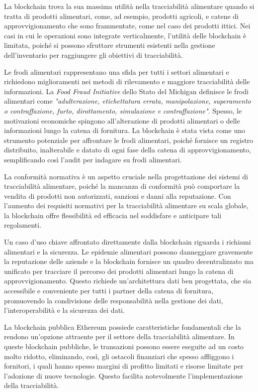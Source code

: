 La blockchain trova la sua massima utilità nella tracciabilità alimentare quando si tratta di prodotti alimentari, come, ad esempio, prodotti agricoli, e catene di approvvigionamento che sono frammentate, come nel caso dei prodotti ittici. Nei casi in cui le operazioni sono integrate verticalmente, l'utilità delle blockchain è limitata, poiché si possono sfruttare strumenti esistenti nella gestione dell'inventario per raggiungere gli obiettivi di tracciabilità.

Le frodi alimentari rappresentano una sfida per tutti i settori alimentari e richiedono miglioramenti nei metodi di rilevamento e maggiore tracciabilità delle informazioni. La \textit{Food Fraud Initiative} dello Stato del Michigan definisce le frodi alimentari come \textit{"adulterazione, etichettatura errata, manipolazione, superamento o contraffazione, furto, dirottamento, simulazione e contraffazione"}. Spesso, le motivazioni economiche spingono all'alterazione di prodotti alimentari o delle informazioni lungo la catena di fornitura. La blockchain è stata vista come uno strumento potenziale per affrontare le frodi alimentari, poiché fornisce un registro distribuito, inalterabile e datato di ogni fase della catena di approvvigionamento, semplificando così l'audit per indagare su frodi alimentari.

La conformità normativa è un aspetto cruciale nella progettazione dei sistemi di tracciabilità alimentare, poiché la mancanza di conformità può comportare la vendita di prodotti non autorizzati, sanzioni e danni alla reputazione. Con l'aumento dei requisiti normativi per la tracciabilità alimentare su scala globale, la blockchain offre flessibilità ed efficacia nel soddisfare e anticipare tali regolamenti.

Un caso d'uso chiave affrontato direttamente dalla blockchain riguarda i richiami alimentari e la sicurezza. Le epidemie alimentari possono danneggiare gravemente la reputazione delle aziende e la blockchain fornisce un quadro decentralizzato ma unificato per tracciare il percorso dei prodotti alimentari lungo la catena di approvvigionamento. Questo richiede un'architettura dati ben progettata, che sia accessibile e conveniente per tutti i partner della catena di fornitura, promuovendo la condivisione delle responsabilità nella gestione dei dati, l'interoperabilità e la sicurezza dei dati.

La blockchain pubblica Ethereum possiede caratteristiche fondamentali che la rendono un'opzione attraente per il settore della tracciabilità alimentare. In queste blockchain pubbliche, le transazioni possono essere eseguite ad un costo molto ridotto, eliminando, così, gli ostacoli finanziari che spesso affliggono i fornitori, i quali hanno spesso margini di profitto limitati e risorse limitate per l'adozione di nuove tecnologie. Questo facilita notevolmente l'implementazione della tracciabilità.

